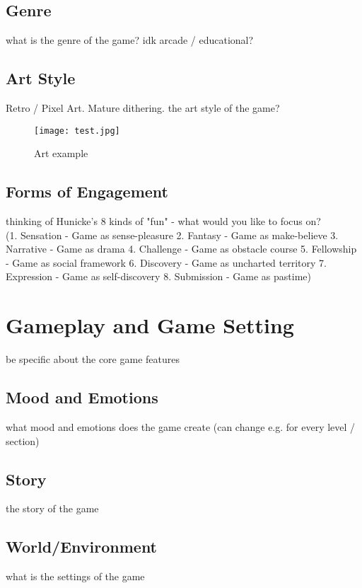 \documentclass[a4paper]{scrreprt}
\begin{document}
\section{Genre}
what is the genre of the game?
idk arcade / educational?

\section{Art Style}
Retro / Pixel Art. Mature dithering.
the art style of the game?

\begin{figure}
\centering
\texttt{[image: test.jpg]}
\caption{\label{fig:art} Art example}
\end{figure}

\section{Forms of Engagement}
thinking of Hunicke's 8 kinds of "fun" - what would you like to focus on?\\
(1. Sensation - Game as sense-pleasure
2. Fantasy - Game as make-believe
3. Narrative - Game as drama
4. Challenge - Game as obstacle course
5. Fellowship -  Game as social framework
6. Discovery - Game as uncharted territory
7. Expression - Game as self-discovery
8. Submission - Game as pastime)



\chapter{Gameplay and Game Setting}
be specific about the core game features

\section{Mood and Emotions}
what mood and emotions does the game create (can change e.g. for every level / section)

\section{Story}
the story of the game

\section{World/Environment}
what is the settings of the game
\end{document}
